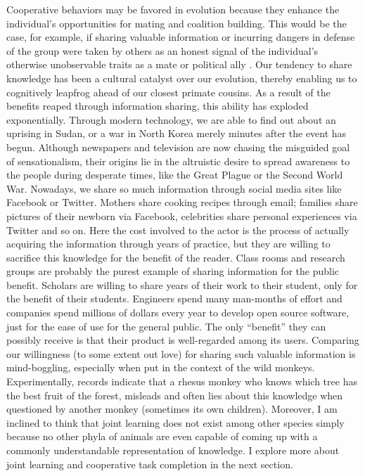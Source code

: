 \documentclass[12pt, letter]{article}
\begin{document}
Cooperative behaviors may be favored in evolution because they enhance the individual’s opportunities for mating and coalition building. This would be the case, for example, if sharing valuable information or incurring dangers in defense of the group were taken by others as an honest signal of the individual’s otherwise unobservable traits as a mate or political ally \cite{bowles2003origins}. Our tendency to share knowledge has been a cultural catalyst over our evolution, thereby enabling us to cognitively leapfrog ahead of our closest primate cousins. As a result of the benefits reaped through information sharing, this ability has exploded exponentially. Through modern technology, we are able to find out about an uprising in Sudan, or a war in North Korea merely minutes after the event has begun. Although newspapers and television are now chasing the misguided goal of sensationalism, their origins lie in the altruistic desire to spread awareness to the people during desperate times, like the Great Plague or the Second World War. Nowadays, we share so much information through social media sites like Facebook or Twitter. Mothers share cooking recipes through email; families share pictures of their newborn via Facebook, celebrities share personal experiences via Twitter and so on. Here the cost involved to the actor is the process of actually acquiring the information through years of practice, but they are willing to sacrifice this knowledge for the benefit of the reader. Class rooms and research groups are probably the purest example of sharing information for the public benefit. Scholars are willing to share years of their work to their student, only for the benefit of their students. Engineers spend many man-months of effort and companies spend millions of dollars every year to develop open source software, just for the ease of use for the general public. The only ``benefit'' they can possibly receive is that their product is well-regarded among its users. Comparing our willingness (to some extent out love) for sharing such valuable information is mind-boggling, especially when put in the context of the wild monkeys. Experimentally, records indicate that a rhesus monkey who knows which tree has the best fruit of the forest, misleads and often lies about this knowledge when questioned by another monkey (sometimes its own children). Moreover, I am inclined to think that joint learning does not exist among other species simply because no other phyla of animals are even capable of coming up with a commonly understandable representation of knowledge. I explore more about joint learning and cooperative task completion in the next section.
\end{document}
